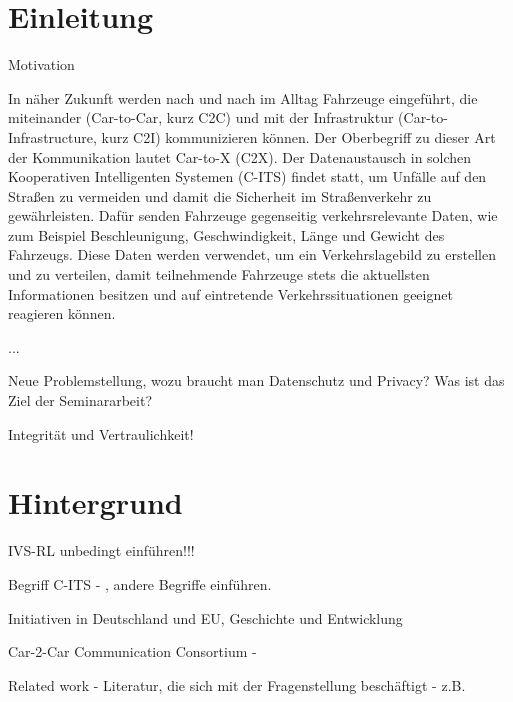 
\section{Einleitung}
\label{ch:Introduction}


Motivation

In näher Zukunft werden nach und nach im Alltag Fahrzeuge eingeführt, die miteinander (Car-to-Car, kurz C2C) und mit der Infrastruktur (Car-to-Infrastructure, kurz C2I) kommunizieren können. Der Oberbegriff zu dieser Art der Kommunikation lautet Car-to-X (C2X). Der Datenaustausch in solchen Kooperativen Intelligenten Systemen (C-ITS) findet statt, um Unfälle auf den Straßen zu vermeiden und damit die Sicherheit im Straßenverkehr zu gewährleisten. Dafür senden Fahrzeuge gegenseitig verkehrsrelevante Daten, wie zum Beispiel Beschleunigung, Geschwindigkeit, Länge und Gewicht des Fahrzeugs. Diese Daten werden verwendet, um ein Verkehrslagebild zu erstellen und zu verteilen, damit teilnehmende Fahrzeuge stets die aktuellsten Informationen besitzen und auf eintretende Verkehrssituationen geeignet reagieren können. 

...\cite{Strubbe2017}

Neue Problemstellung, wozu braucht man Datenschutz und Privacy? Was ist das Ziel der Seminararbeit?

Integrität und Vertraulichkeit!




\section{Hintergrund}
\label{ch:Citation}

IVS-RL unbedingt einführen!!!

Begriff C-ITS - \cite{CITS2016}, andere Begriffe einführen.

Initiativen in Deutschland und EU, Geschichte und Entwicklung

Car-2-Car Communication Consortium - \cite{Car2Car}

Related work - Literatur, die sich mit der Fragenstellung beschäftigt - z.B. \cite{Jochum2020}

